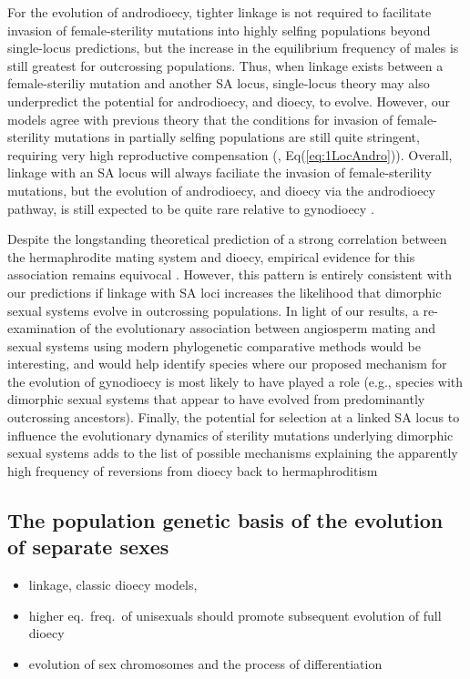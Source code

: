 \documentclass[9pt,twocolumn,twoside,lineno]{gsajnl}
\begin{document}
For the evolution of androdioecy, tighter linkage is not required to facilitate invasion of female-sterility mutations into highly selfing populations beyond single-locus predictions, but the increase in the equilibrium frequency of males is still greatest for outcrossing populations. Thus, when linkage exists between a female-steriliy mutation and another SA locus, single-locus theory may also underpredict the potential for androdioecy, and dioecy, to evolve. However, our models agree with previous theory that the conditions for invasion of female-sterility mutations in partially selfing populations are still quite stringent, requiring very high reproductive compensation (\citealt{Charlesworth1978a}, Eq(\ref{eq:1LocAndro})). Overall, linkage with an SA locus will always faciliate the invasion of female-sterility mutations, but the evolution of androdioecy, and dioecy via the androdioecy pathway, is still expected to be quite rare relative to gynodioecy \citep{Charlesworth1978a,Charlesworth2006,KaferPannell2017,Renner2014}.

Despite the longstanding theoretical prediction of a strong correlation between the hermaphrodite mating system and dioecy, empirical evidence for this association remains equivocal \citep{Charlesworth1985,Charlesworth2006,Renner2014}. However, this pattern is entirely consistent with our predictions if linkage with SA loci increases the likelihood that dimorphic sexual systems evolve in outcrossing populations. In light of our results, a re-examination of the evolutionary association between angiosperm mating and sexual systems using modern phylogenetic comparative methods would be interesting, and would help identify species where our proposed mechanism for the evolution of gynodioecy is most likely to have played a role (e.g., species with dimorphic sexual systems that appear to have evolved from predominantly outcrossing ancestors). Finally, the potential for selection at a linked SA locus to influence the evolutionary dynamics of sterility mutations underlying dimorphic sexual systems adds to the list of possible mechanisms explaining the apparently high frequency of reversions from dioecy back to hermaphroditism \citep{GoldbergOtto2017,KaferPannell2017}


\subsection{The population genetic basis of the evolution of separate sexes}

\begin{itemize}
	\item linkage, classic dioecy models, 
	\item higher eq.~freq.~of unisexuals should promote subsequent evolution of full dioecy
	\item evolution of sex chromosomes and the process of differentiation
\end{itemize}
\end{document}
